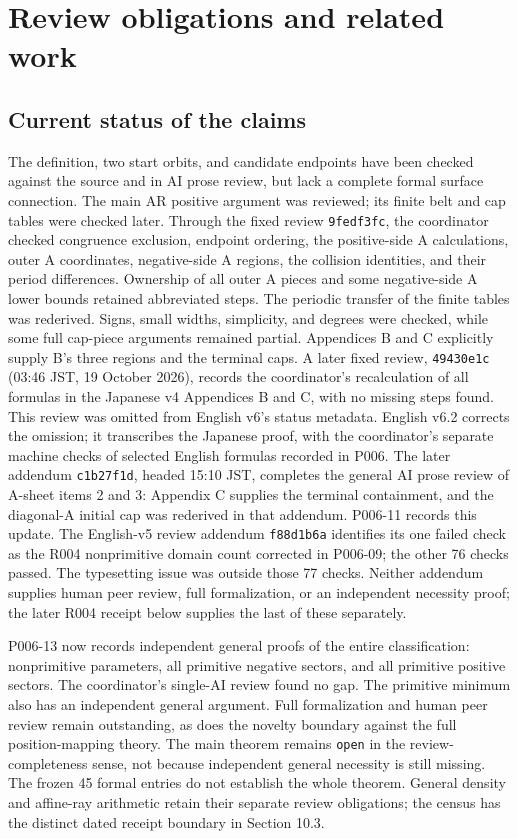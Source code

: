 \documentclass[11pt]{amsart}
\newcommand{\record}[1]{\nolinkurl{#1}}
\begin{document}
\section{Review obligations and related work}\label{sec:review}
\subsection{Current status of the claims}
The definition, two start orbits, and candidate endpoints have been
checked against the source and in AI prose review, but lack a complete
formal surface connection. The main AR positive argument was reviewed;
its finite belt and cap tables were checked later. Through the fixed
review \record{9fedf3fc}, the coordinator checked congruence exclusion,
endpoint ordering, the positive-side A calculations, outer A coordinates,
negative-side A regions, the collision identities, and their period
differences. Ownership of all outer A pieces and some negative-side A
lower bounds retained abbreviated steps. The periodic transfer of the
finite tables was rederived. Signs, small widths, simplicity, and degrees
were checked, while some full cap-piece arguments remained partial.
Appendices B and C explicitly supply B's three regions and the terminal
caps. A later fixed review, \record{49430e1c} (03:46 JST, 19 October
2026), records the coordinator's recalculation of all formulas in the
Japanese v4 Appendices B and C, with no missing steps found. This review
was omitted from English v6's status metadata. English v6.2 corrects the
omission; it transcribes the Japanese proof, with the coordinator's
separate machine checks of selected English formulas recorded in P006.
The later addendum \record{c1b27f1d}, headed 15:10 JST, completes
the general AI prose review of A-sheet items 2 and 3: Appendix C
supplies the terminal containment, and the diagonal-A initial cap
was rederived in that addendum. P006-11 records this update.
The English-v5 review addendum \record{f88d1b6a} identifies its one
failed check as the R004 nonprimitive domain count corrected in
P006-09; the other 76 checks passed. The typesetting issue was
outside those 77 checks. Neither addendum supplies human peer
review, full formalization, or an independent necessity proof; the later
R004 receipt below supplies the last of these separately.

P006-13 now records independent general proofs of the entire
classification: nonprimitive parameters, all primitive negative sectors,
and all primitive positive sectors. The coordinator's single-AI review
found no gap. The primitive minimum also has an independent general
argument. Full formalization and human peer review remain outstanding,
as does the novelty boundary against the full position-mapping theory.
The main theorem remains \texttt{open} in the review-completeness sense,
not because independent general necessity is still missing. The frozen
45 formal entries do not establish the whole theorem. General density
and affine-ray arithmetic retain their separate review obligations;
the census has the distinct dated receipt boundary in Section 10.3.
\end{document}
